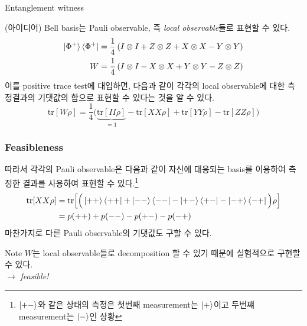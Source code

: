 \documentclass[9pt]{beamer}
\begin{document}
\begin{section}{Entanglement witness}
\begin{frame}
            \vspace{0.2cm}
            (아이디어) Bell basis는 Pauli observable, 즉 \textit{local observable}들로 표현할 수 있다.
            \begin{align*}
                \ket{\Phi^+}\bra{\Phi^+} = \frac{1}{4} \left( I\otimes I + Z\otimes Z + X \otimes X - Y \otimes Y \right) \\
                W = \frac{1}{4} \left( I \otimes I - X \otimes X + Y \otimes Y - Z \otimes Z \right)
            \end{align*}
            이를 positive trace test에 대입하면, 다음과 같이 각각의 \alert{local observable에 대한 측정결과의 기댓값의 합}으로 표현할 수 있다는 것을 알 수 있다.
            \begin{equation*}
                \text{tr}[W \rho] = \frac{1}{4}\bigg(\underbrace{\text{tr} [II\rho]}_{=1} - \text{tr} [XX\rho] + \text{tr} [YY\rho] - \text{tr} [ZZ\rho] \bigg)
            \end{equation*}
        \end{frame}

        \begin{frame}
            \frametitle{Feasibleness}
            따라서 각각의 Pauli observable은 다음과 같이 자신에 대응되는 basis를 이용하여 측정한 결과를 사용하여 표현할 수 있다.\footnote{$\ket{+-}$와 같은 상태의 측정은 첫번째 measurement는 $\ket +$이고 두번쨰 measurement는 $\ket -$인 상황}
            \begin{align*}
                \text{tr}[XX \rho] &= \text{tr}\Big[\Big(\ket{++} \bra{++} + \ket{--} \bra{--} - \ket{+-} \bra{+-} - \ket{-+}\bra{-+}\Big)\rho\Big] \\
                    &= p(++) + p(--) - p(+-) - p(-+)
            \end{align*}
            마찬가지로 다른 Pauli observable의 기댓값도 구할 수 있다.
            \begin{block}{Note}
                $W$는 local observable들로 decomposition 할 수 있기 때문에 실험적으로 구현할 수 있다. \\
                $\longrightarrow$ \textit{feasible!}
            \end{block}
        \end{frame}
        

\end{section}
\end{document}
